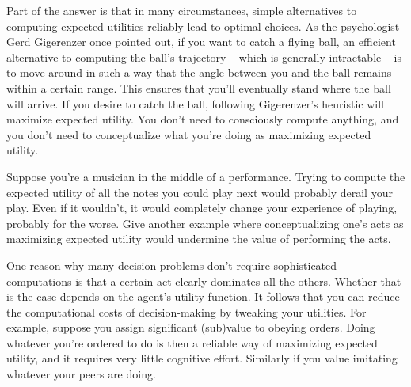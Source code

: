 Part of the answer is that in many circumstances, simple alternatives
to computing expected utilities reliably lead to optimal choices. As
the psychologist Gerd Gigerenzer once pointed out, if you want to
catch a flying ball, an efficient alternative to computing the ball's
trajectory -- which is generally intractable -- is to move around in
such a way that the angle between you and the ball remains within a
certain range. This ensures that you'll eventually stand where the
ball will arrive. If you desire to catch the ball, following
Gigerenzer's heuristic will maximize expected utility. You don't need
to consciously compute anything, and you don't need to conceptualize
what you're doing as maximizing expected utility.

\begin{exercise1}
  Suppose you're a musician in the middle of a performance. Trying to
  compute the expected utility of all the notes you could play next
  would probably derail your play. Even if it wouldn't, it would
  completely change your experience of playing, probably for the
  worse. Give another example where conceptualizing one's acts as
  maximizing expected utility would undermine the value of performing
  the acts. 
\end{exercise1}

One reason why many decision problems don't require sophisticated
computations is that a certain act clearly dominates all the others.
Whether that is the case depends on the agent's utility function. It
follows that you can reduce the computational costs of decision-making
by tweaking your utilities. For example, suppose you assign
significant (sub)value to obeying orders. Doing whatever you're
ordered to do is then a reliable way of maximizing expected utility,
and it requires very little cognitive effort. Similarly if you value
imitating whatever your peers are doing.


